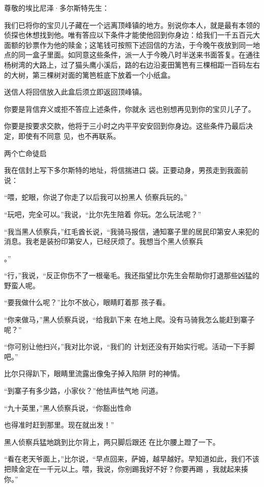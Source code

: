 \documentclass{article}
\begin{document}
尊敬的埃比尼泽·多尔斯特先生： 

我们已将你的宝贝儿子藏在一个远离顶峰镇的地方。别说你本人，就是最有本领的侦探也休想找到他。唯有答应以下条件才能使他回到你身边：给我们一千五百元大面额的钞票作为他的赎金；这笔钱可按照下述回信的方法，于今晚午夜放到同一地点的同一盒子里面。如同意这些条件，派一人于今晚八时半送来书面答复。在通往杨树湾的大路上，过了猫头鹰小溪后，路的右边沿麦田篱笆有三棵相距一百码左右的大树，第三棵树对面的篱笆桩底下放着一个小纸盒。

送信人将回信放入此盒后须立即返回顶峰镇。

\newpage

你要是背信弃义或拒不答应上述条件，你就永
远也别想再见到你的宝贝儿子了。 

你要是按要求交款，他将于三小时之内平平安安回到你身边。这些条件乃最后决定，即使有不同意
见，也不再联系。 


两个亡命徒启 

我在信封上写下多尔斯特的地址，将信揣进口
袋。正要动身，男孩走到我面前说： 

“喂，蛇眼，你说了你走了以后我可以扮黑人
侦察兵玩的。” 

“玩吧，完全可以。”我说，“比尔先生陪着
你玩。怎么玩法呢？” 

“我当黑人侦察兵，”红毛酋长说，“我骑马报信，通知寨子里的居民印第安人来犯的消息。我老是装扮印第安人，已经厌烦了。我想当个黑人侦察兵
\newpage

。” 

“行，”我说，“反正你伤不了一根毫毛。我还指望比尔先生会帮助你打退那些凶猛的野蛮人呢。

“要我做什么呢？”比尔不放心，眼睛盯着那
孩子看。 

“你来做马，”黑人侦察兵说，“给我趴下来
在地上爬。没有马骑我怎么能赶到寨子呢？” 

“你可别让他扫兴，”我对比尔说，“我们的
计划还没有开始实行呢。活动一下手脚吧。” 

比尔只得趴下，眼睛里流露出像兔子掉入陷阱
时的神情。 

“到寨子有多少路，小家伙？”他怯声怯气地
问道。 

“九十英里，”黑人侦察兵说，“你豁出性命
\newpage

也得准时赶到那里。现在就出发！” 

黑人侦察兵猛地跳到比尔背上，两只脚后跟还
在比尔腰上蹬了一下。 

“看在老天爷面上，”比尔说，“早点回来，萨姆，越早越好。早知道如此，我们不该把赎金定在一千元以上。喂，我说，你别踢我好不好？你要再踢
，我就起来揍你。” 
\end{document}

